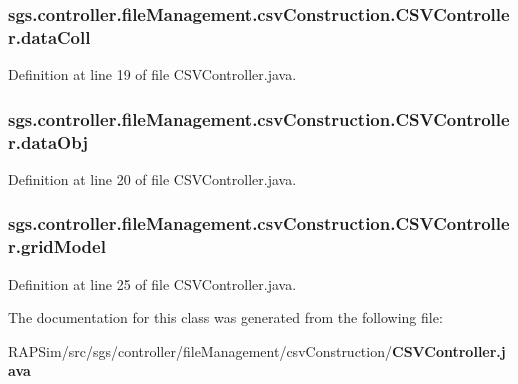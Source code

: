 \subsubsection[{data\-Coll}]{ sgs.\-controller.\-file\-Management.\-csv\-Construction.\-C\-S\-V\-Controller.\-data\-Coll}\label{classsgs_1_1controller_1_1file_management_1_1csv_construction_1_1_c_s_v_controller_ab4aefa09a2420e11fcfb42c9ebf8171f}


Definition at line 19 of file C\-S\-V\-Controller.\-java.

\subsubsection[{data\-Obj}]{ sgs.\-controller.\-file\-Management.\-csv\-Construction.\-C\-S\-V\-Controller.\-data\-Obj}\label{classsgs_1_1controller_1_1file_management_1_1csv_construction_1_1_c_s_v_controller_a56914722a14d6c429d57f4dfd680a945}


Definition at line 20 of file C\-S\-V\-Controller.\-java.

\subsubsection[{grid\-Model}]{ sgs.\-controller.\-file\-Management.\-csv\-Construction.\-C\-S\-V\-Controller.\-grid\-Model}\label{classsgs_1_1controller_1_1file_management_1_1csv_construction_1_1_c_s_v_controller_ab8dae78be7f83e4984f2f31bbf02cf80}


Definition at line 25 of file C\-S\-V\-Controller.\-java.



The documentation for this class was generated from the following file\-:\begin{DoxyCompactItemize}
\item 
R\-A\-P\-Sim/src/sgs/controller/file\-Management/csv\-Construction/{\bf C\-S\-V\-Controller.\-java}\end{DoxyCompactItemize}
